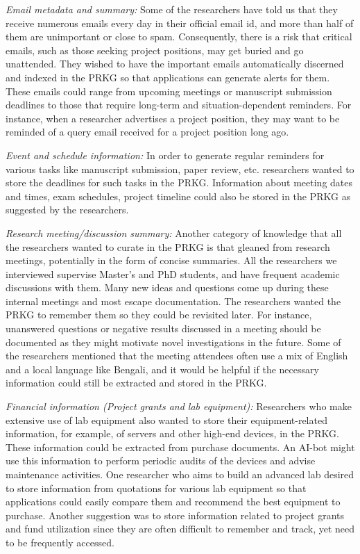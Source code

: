 \documentclass[11pt,pdftex]{article}
\begin{document}
\textit{Email metadata and summary: }Some of the researchers have told us that they receive numerous emails every day in their official email id, and more than half of them are unimportant or close to spam. Consequently, there is a risk that critical emails, such as those seeking project positions, may get buried and go unattended. They wished to have the important emails automatically discerned and indexed in the PRKG so that applications can generate alerts for them. These emails could range from upcoming meetings or manuscript submission deadlines to those that require long-term and situation-dependent reminders. For instance, when a researcher advertises a project position, they may want to be reminded of a query email received for a project position long ago. 

\textit{Event and schedule information: }In order to generate regular reminders for various tasks like manuscript submission, paper review, etc. researchers wanted to store the deadlines for such tasks in the PRKG. Information about meeting dates and times, exam schedules, project timeline could also be stored in the PRKG as suggested by the researchers.

\textit{Research meeting/discussion summary: }Another category of knowledge that all the researchers wanted to curate in the PRKG is that gleaned from research meetings, potentially in the form of concise summaries. All the researchers we interviewed supervise Master's and PhD students, and have frequent academic discussions with them. Many new ideas and questions come up during these internal meetings and most escape documentation. The researchers wanted the PRKG to remember them so they could be revisited later. For instance, unanswered questions or negative results discussed in a meeting should be documented as they might motivate novel investigations in the future. Some of the researchers mentioned that the meeting attendees often use a mix of English and a local language like Bengali, and it would be helpful if the necessary information could still be extracted and stored in the PRKG.

\textit{Financial information (Project grants and lab equipment): }Researchers who make extensive use of lab equipment also wanted to store their equipment-related information, for example, of servers and other high-end devices, in the PRKG. These information could be extracted from purchase documents. An AI-bot might use this information to perform periodic audits of the devices and advise maintenance activities. One researcher who aims to build an advanced lab desired to store information from quotations for various lab equipment so that applications could easily compare them and recommend the best equipment to purchase. Another suggestion was to store information related to project grants and fund utilization since they are often difficult to remember and track, yet need to be frequently accessed. 
\end{document}
